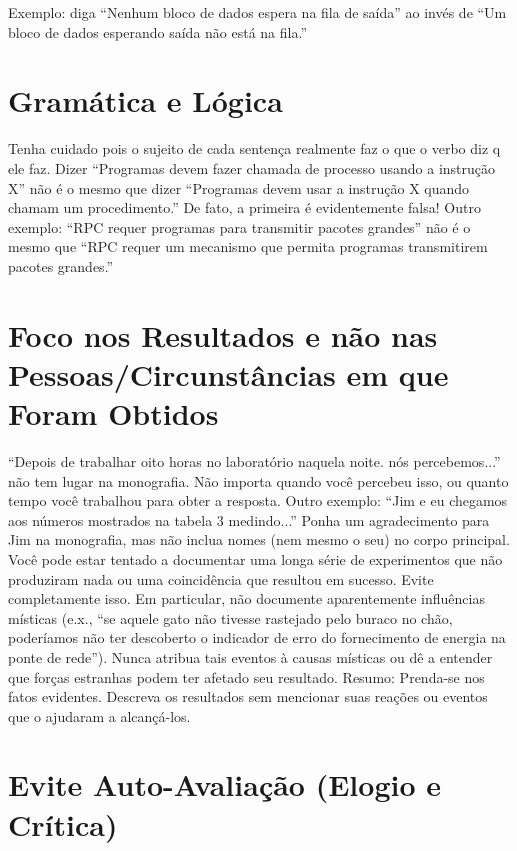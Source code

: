 Exemplo: diga ``Nenhum bloco de dados espera na fila de sa\'{i}da'' ao inv\'{e}s de ``Um bloco de dados esperando sa\'{i}da n\~{a}o est\'{a} na fila.''

\section{Gram\'{a}tica e L\'{o}gica}

Tenha cuidado pois o sujeito de cada senten\c{c}a realmente faz o que o verbo diz q ele faz. 
Dizer ``Programas devem fazer chamada de processo usando a instru\c{c}\~{a}o X'' n\~{a}o \'{e} o mesmo que dizer ``Programas devem usar a instru\c{c}\~{a}o X quando chamam um procedimento.'' 
De fato, a primeira \'{e} evidentemente falsa! 
Outro exemplo: ``RPC requer programas para transmitir pacotes grandes'' n\~{a}o \'{e} o mesmo que ``RPC requer um mecanismo que permita programas transmitirem pacotes grandes.''

\section{Foco nos Resultados e n\~{a}o nas Pessoas/Circunst\^{a}ncias em que Foram Obtidos}
		
``Depois de trabalhar oito horas no laborat\'{o}rio naquela noite. n\'{o}s percebemos...'' n\~{a}o tem lugar na monografia. 
N\~{a}o importa quando você percebeu isso, ou quanto tempo você trabalhou para obter a resposta. 
Outro exemplo: ``Jim e eu chegamos aos n\'{u}meros mostrados na tabela 3 medindo...'' Ponha um agradecimento para Jim na monografia, mas n\~{a}o inclua nomes (nem mesmo o seu) no corpo principal. 
Você pode estar tentado a documentar uma longa s\'{e}rie de experimentos que n\~{a}o produziram nada ou uma coincidência que resultou em sucesso. Evite completamente isso. 
Em particular, n\~{a}o documente aparentemente influências m\'{i}sticas (e.x., ``se aquele gato n\~{a}o tivesse rastejado pelo buraco no ch\~{a}o, poder\'{i}amos 
n\~{a}o ter descoberto o indicador de erro do fornecimento de energia na ponte de rede''). Nunca atribua tais eventos à causas m\'{i}sticas ou dê a 
entender que for\c{c}as estranhas podem ter afetado seu resultado. 
Resumo: Prenda-se nos fatos evidentes. Descreva os resultados sem mencionar suas rea\c{c}\~{o}es ou eventos que o ajudaram a alcan\c{c}\'{a}-los.

\section{Evite Auto-Avalia\c{c}\~{a}o (Elogio e Cr\'{i}tica)}

